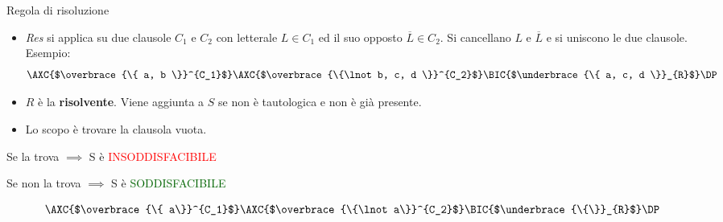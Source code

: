\documentclass{beamer}
\begin{document}
\begin{frame}{Regola di risoluzione}
    \begin{itemize}
        \item \emph{Res} si applica su due clausole $C_1$ e $C_2$ con letterale $L \in C_1$ ed il suo opposto $\overline{L} \in C_2$. Si cancellano $L$ e $\overline{L}$ e si uniscono le due clausole.
        Esempio:
        \[
            \AXC{$\overbrace{\{ a, b \}}^{C_1}$}
            \AXC{$\overbrace{\{\lnot b, c, d \}}^{C_2}$}
            \RightLabel{Res}
            \BIC{$\underbrace{\{ a, c, d \}}_{R}$}
            \DP
        \]
        \item $R$ è la \textbf{risolvente}. Viene aggiunta a $S$ se non è tautologica e non è già presente.
        
    \end{itemize}

    \begin{center}
        \begin{minipage}{0.45\textwidth}
            \begin{itemize}
                \item Lo scopo è trovare la clausola vuota.
            \end{itemize}
            Se la trova $\implies$ S è \textcolor{red}{INSODDISFACIBILE}

            Se non la trova $\implies$ S è \textcolor{darkgreen}{SODDISFACIBILE}
        \end{minipage}
        \hspace{0.05\textwidth}
        \begin{minipage}{0.45\textwidth}
            \small
            \[
                \AXC{$\overbrace{\{ a\}}^{C_1}$}
                \AXC{$\overbrace{\{\lnot a\}}^{C_2}$}
                \RightLabel{Res}
                \BIC{$\underbrace{\{\}}_{R}$}
                \DP
            \]
        \end{minipage}
    \end{center}
\end{frame}

\end{document}
